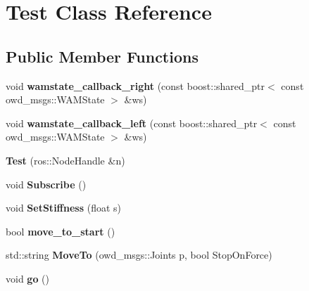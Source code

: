 \hypertarget{classTest}{\section{Test Class Reference}
\label{classTest}
}
\subsection*{Public Member Functions}
\begin{DoxyCompactItemize}
\item 
\hypertarget{classTest_a1345fb3e9b4c95403b7dd3ebe53e58c2}{void {\bfseries wamstate\-\_\-callback\-\_\-right} (const boost\-::shared\-\_\-ptr$<$ const owd\-\_\-msgs\-::\-W\-A\-M\-State $>$ \&ws)}\label{classTest_a1345fb3e9b4c95403b7dd3ebe53e58c2}

\item 
\hypertarget{classTest_a45a318d44f1a977409e35a2a94b0dc50}{void {\bfseries wamstate\-\_\-callback\-\_\-left} (const boost\-::shared\-\_\-ptr$<$ const owd\-\_\-msgs\-::\-W\-A\-M\-State $>$ \&ws)}\label{classTest_a45a318d44f1a977409e35a2a94b0dc50}

\item 
\hypertarget{classTest_ab1e3525f102f33d7f2e05632b9b3d61e}{{\bfseries Test} (ros\-::\-Node\-Handle \&n)}\label{classTest_ab1e3525f102f33d7f2e05632b9b3d61e}

\item 
\hypertarget{classTest_a7ed02f7fb36d7459785a7822656a23f7}{void {\bfseries Subscribe} ()}\label{classTest_a7ed02f7fb36d7459785a7822656a23f7}

\item 
\hypertarget{classTest_ab1e110d5eda2e9970e0bfb29e3476f74}{void {\bfseries Set\-Stiffness} (float s)}\label{classTest_ab1e110d5eda2e9970e0bfb29e3476f74}

\item 
\hypertarget{classTest_a25c593aefca062bbbd6d39065e9cefc4}{bool {\bfseries move\-\_\-to\-\_\-start} ()}\label{classTest_a25c593aefca062bbbd6d39065e9cefc4}

\item 
\hypertarget{classTest_a1c5fd4fa499f8503db6103440b873c32}{std\-::string {\bfseries Move\-To} (owd\-\_\-msgs\-::\-Joints p, bool Stop\-On\-Force)}\label{classTest_a1c5fd4fa499f8503db6103440b873c32}

\item 
\hypertarget{classTest_a96454514cfaf876bf31ed62616c7dcd6}{void {\bfseries go} ()}\label{classTest_a96454514cfaf876bf31ed62616c7dcd6}


\end{DoxyCompactItemize}
